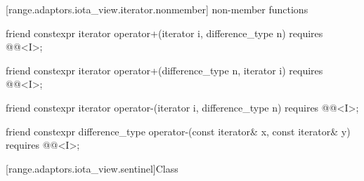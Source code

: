 {[range.adaptors.iota_view.iterator.nonmember]{ non-member functions}

\begin{itemdecl}
friend constexpr iterator operator+(iterator i, difference_type n)
  requires @@<I>;
\end{itemdecl}

\begin{itemdescr}
\pnum
\oldtxt{\returns} 
\end{itemdescr}

\begin{itemdecl}
friend constexpr iterator operator+(difference_type n, iterator i)
  requires @@<I>;
\end{itemdecl}

\begin{itemdescr}
\pnum
\oldtxt{\returns} 
\end{itemdescr}

\begin{itemdecl}
friend constexpr iterator operator-(iterator i, difference_type n)
  requires @@<I>;
\end{itemdecl}

\begin{itemdescr}
\pnum
\oldtxt{\returns} 
\end{itemdescr}

\begin{itemdecl}
friend constexpr difference_type operator-(const iterator& x, const iterator& y)
  requires @@<I>;
\end{itemdecl}

\begin{itemdescr}
\pnum
\oldtxt{\returns} 
\end{itemdescr}

[range.adaptors.iota_view.sentinel]{Class }

}

